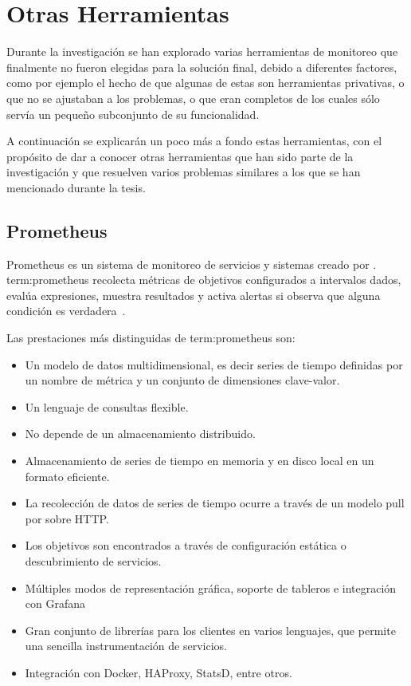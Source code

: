 \section{Otras Herramientas}
\label{anexo:B}

Durante la investigación se han explorado varias herramientas de monitoreo
que finalmente no fueron elegidas para la solución final, debido a diferentes
factores, como por ejemplo el hecho de que algunas de estas son herramientas
privativas, o que no se ajustaban a los problemas, o que eran 
completos de los cuales sólo servía un pequeño subconjunto de su funcionalidad.

A continuación se explicarán un poco más a fondo estas herramientas, con el
propósito de dar a conocer otras herramientas que han sido parte de la
investigación y que resuelven varios problemas similares a los que se han
mencionado durante la tesis.

\subsection{Prometheus}

Prometheus es un sistema de monitoreo de servicios y sistemas creado por
. \gls{term:prometheus} recolecta
métricas de objetivos configurados a intervalos dados, evalúa expresiones,
muestra resultados y activa alertas si observa que alguna condición es
verdadera~\cite{prometheus}.

Las prestaciones más distinguidas de \gls{term:prometheus} son:

\begin{itemize}
  \item Un modelo de datos multidimensional, es decir series de tiempo
    definidas por un nombre de métrica y un conjunto de dimensiones
    clave-valor.
  \item Un lenguaje de consultas flexible.
  \item No depende de un almacenamiento distribuido.
  \item Almacenamiento de series de tiempo en memoria y en disco local en un
    formato eficiente.
  \item La recolección de datos de series de tiempo ocurre a través de un
    modelo pull por sobre HTTP.
  \item Los objetivos son encontrados a través de configuración estática o
    descubrimiento de servicios.
  \item Múltiples modos de representación gráfica, soporte de tableros e
    integración con Grafana
  \item Gran conjunto de librerías para los clientes en varios lenguajes, que
    permite una sencilla instrumentación de servicios.
  \item Integración con Docker, HAProxy, StatsD, entre otros.
\end{itemize}

